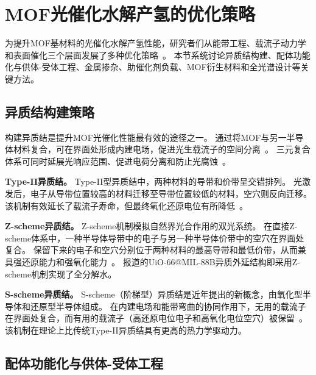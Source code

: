 \section{MOF光催化水解产氢的优化策略}\label{sec:method}

为提升MOF基材料的光催化水解产氢性能，研究者们从能带工程、载流子动力学和表面催化三个层面发展了多种优化策略~\citep{zhang2025optimization_strategies}。 %
本节系统讨论异质结构建、配体功能化与供体-受体工程、金属掺杂、助催化剂负载、MOF衍生材料和全光谱设计等关键方法。


\subsection{异质结构建策略}

构建异质结是提升MOF光催化性能最有效的途径之一。
通过将MOF与另一半导体材料复合，可在界面处形成内建电场，促进光生载流子的空间分离~\citep{chen2024heterostructures_h2}。 %
三元复合体系可同时延展光响应范围、促进电荷分离和防止光腐蚀~\citep{chen2024heterostructures_h2}。 %

\textbf{Type-II异质结。}
Type-II型异质结中，两种材料的导带和价带呈交错排列。
光激发后，电子从导带位置较高的材料迁移至导带位置较低的材料，空穴则反向迁移。
该机制有效延长了载流子寿命，但最终氧化还原电位有所降低~\citep{zhang2025optimization_strategies}。 %

\textbf{Z-scheme异质结。}
Z-scheme机制模拟自然界光合作用的双光系统。
在直接Z-scheme体系中，一种半导体导带中的电子与另一种半导体价带中的空穴在界面处复合。
保留下来的电子和空穴分别位于两种材料的最高导带和最低价带，从而兼具强还原能力和强氧化能力~\citep{zhang2025optimization_strategies}。 %
\citet{uio66_mil88b_2024}报道的UiO-66@MIL-88B异质外延结构即采用Z-scheme机制实现了全分解水。 %

\textbf{S-scheme异质结。}
S-scheme（阶梯型）异质结是近年提出的新概念，由氧化型半导体和还原型半导体组成。
在内建电场和能带弯曲的协同作用下，无用的载流子在界面处复合，而有用的载流子（高还原电位电子和高氧化电位空穴）被保留~\citep{zhang2025optimization_strategies}。 %
该机制在理论上比传统Type-II异质结具有更高的热力学驱动力。


\subsection{配体功能化与供体-受体工程}


